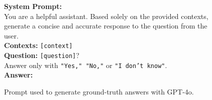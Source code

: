 \begin{figure*}[ht!]
    \centering
    \begin{tcolorbox}[
        enhanced,                  %
        colframe=orange!70!black,  %
        colback=orange!5,          %
        coltitle=white,            %
        colbacktitle=orange!70!black,%
        width=\textwidth,          %
        arc=4mm,                   %
        boxrule=1mm,               %
        drop shadow,               %
        title=Shadow LLM Prompt for Ground-Truth Answers, %
        fonttitle=\bfseries\large  %
    ]

    \textbf{System Prompt:}\\[1em]

    You are a helpful assistant. Based solely on the provided contexts, generate a concise and accurate response to the question from the user.\\[1em]

    \textbf{Contexts:} \texttt{[context]}\\[1em]
    \textbf{Question:} \texttt{[question]}?\\[1em]
    Answer only with \texttt{"Yes," "No,"} or \texttt{"I don't know"}.\\[1em]

    \textbf{Answer:}

    \end{tcolorbox}
    \caption{Prompt used to generate ground-truth answers with GPT-4o.}
    \label{fig:shadow_llm_prompt}
\end{figure*}
